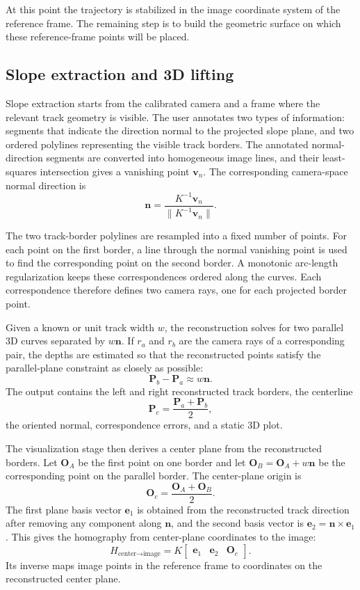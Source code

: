 At this point the trajectory is stabilized in the image coordinate system of the reference frame. The remaining step is to build the geometric surface on which these reference-frame points will be placed.

\subsection{Slope extraction and 3D lifting}
Slope extraction starts from the calibrated camera and a frame where the relevant track geometry is visible. The user annotates two types of information: segments that indicate the direction normal to the projected slope plane, and two ordered polylines representing the visible track borders. The annotated normal-direction segments are converted into homogeneous image lines, and their least-squares intersection gives a vanishing point \(\mathbf{v}_n\). The corresponding camera-space normal direction is
\[
\mathbf{n} = \frac{K^{-1}\mathbf{v}_n}{\|K^{-1}\mathbf{v}_n\|}.
\]

The two track-border polylines are resampled into a fixed number of points. For each point on the first border, a line through the normal vanishing point is used to find the corresponding point on the second border. A monotonic arc-length regularization keeps these correspondences ordered along the curves. Each correspondence therefore defines two camera rays, one for each projected border point.

Given a known or unit track width \(w\), the reconstruction solves for two parallel 3D curves separated by \(w\mathbf{n}\). If \(r_a\) and \(r_b\) are the camera rays of a corresponding pair, the depths are estimated so that the reconstructed points satisfy the parallel-plane constraint as closely as possible:
\[
\mathbf{P}_b - \mathbf{P}_a \approx w\mathbf{n}.
\]
The output contains the left and right reconstructed track borders, the centerline
\[
\mathbf{P}_c = \frac{\mathbf{P}_a+\mathbf{P}_b}{2},
\]
the oriented normal, correspondence errors, and a static 3D plot.

The visualization stage then derives a center plane from the reconstructed borders. Let \(\mathbf{O}_A\) be the first point on one border and let \(\mathbf{O}_B=\mathbf{O}_A+w\mathbf{n}\) be the corresponding point on the parallel border. The center-plane origin is
\[
\mathbf{O}_c = \frac{\mathbf{O}_A+\mathbf{O}_B}{2}.
\]
The first plane basis vector \(\mathbf{e}_1\) is obtained from the reconstructed track direction after removing any component along \(\mathbf{n}\), and the second basis vector is \(\mathbf{e}_2=\mathbf{n}\times\mathbf{e}_1\). This gives the homography from center-plane coordinates to the image:
\[
H_{\text{center}\rightarrow\text{image}} =
K
\begin{bmatrix}
\mathbf{e}_1 & \mathbf{e}_2 & \mathbf{O}_c
\end{bmatrix}.
\]
Its inverse maps image points in the reference frame to coordinates on the reconstructed center plane.

